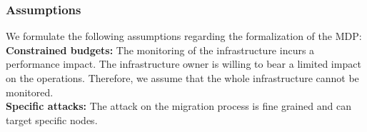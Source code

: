 \subsubsection{Assumptions}
\label{sec:mdp-reqiorements}
We formulate the following assumptions regarding the formalization of the MDP:\\
\textbf{Constrained budgets: } The monitoring of the infrastructure incurs a performance impact. The infrastructure owner is willing to bear a limited impact on the operations. Therefore, we assume that the whole infrastructure cannot be monitored. \\
\textbf{Specific attacks: } The attack on the migration process is fine grained and can target specific nodes.
